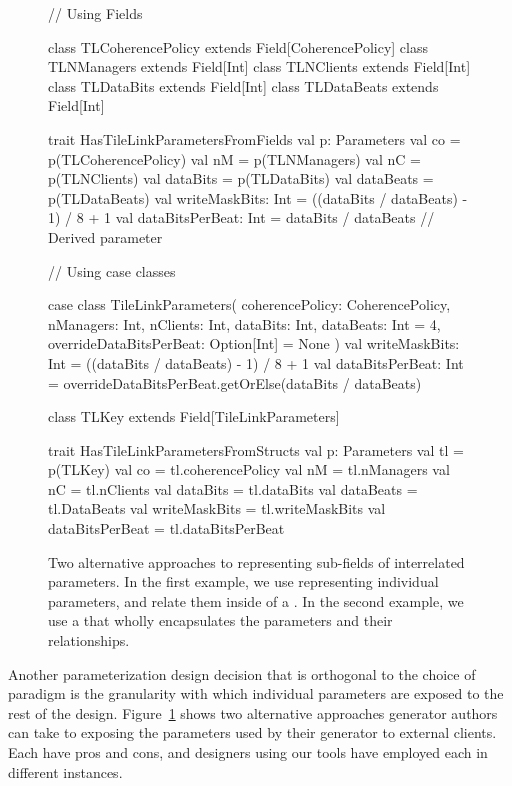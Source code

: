 \begin{figure}
\centering
\begin{scala}
// Using Fields

class TLCoherencePolicy extends Field[CoherencePolicy]
class TLNManagers extends Field[Int]
class TLNClients extends Field[Int]
class TLDataBits extends Field[Int]
class TLDataBeats extends Field[Int]

trait HasTileLinkParametersFromFields {
  val p: Parameters
  val co = p(TLCoherencePolicy)
  val nM = p(TLNManagers)
  val nC = p(TLNClients)
  val dataBits = p(TLDataBits)
  val dataBeats = p(TLDataBeats)
  val writeMaskBits: Int = ((dataBits / dataBeats) - 1) / 8 + 1
  val dataBitsPerBeat: Int = dataBits / dataBeats // Derived parameter
}

// Using case classes

case class TileLinkParameters(
    coherencePolicy: CoherencePolicy,
    nManagers: Int,
    nClients: Int,
    dataBits: Int,
    dataBeats: Int = 4,
    overrideDataBitsPerBeat: Option[Int] = None
    ) {
  val writeMaskBits: Int  = ((dataBits / dataBeats) - 1) / 8 + 1
  val dataBitsPerBeat: Int = overrideDataBitsPerBeat.getOrElse(dataBits / dataBeats)
}

class TLKey extends Field[TileLinkParameters]

trait HasTileLinkParametersFromStructs {
  val p: Parameters
  val tl = p(TLKey)
  val co = tl.coherencePolicy
  val nM = tl.nManagers
  val nC = tl.nClients
  val dataBits = tl.dataBits
  val dataBeats = tl.DataBeats
  val writeMaskBits = tl.writeMaskBits
  val dataBitsPerBeat = tl.dataBitsPerBeat
}
  
\end{scala} 
\caption{
Two alternative approaches to representing sub-fields of interrelated parameters.
In the first example, we use  representing individual parameters, and relate them inside of a .
In the second example, we use a  that wholly encapsulates the parameters and their relationships.
}
\label{fig:fields}
\end{figure}

Another parameterization design decision that is orthogonal to the choice of paradigm is
the granularity with which individual parameters are exposed to the rest of the design.
Figure~\ref{fig:fields} shows two alternative approaches generator authors can take to exposing
the parameters used by their generator to external clients.
Each have pros and cons, and designers using our tools have employed each in different instances.

